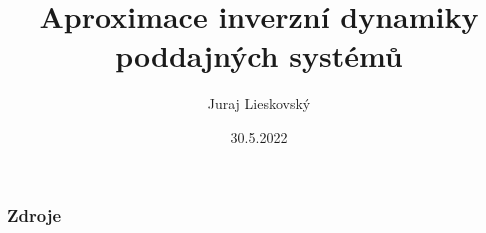 \documentclass{beamer}
\title{Aproximace inverzní dynamiky poddajných systémů}
\author{Juraj Lieskovský}
\institute{ČVUT - ústav mechaniky, biomechaniky a mechatroniky}
\date{30.5.2022}
\begin{document}
	\frame{\titlepage}

	
	
	
	

	
	\begin{frame}
		\frametitle{Zdroje}
		
	\end{frame}
\end{document}
